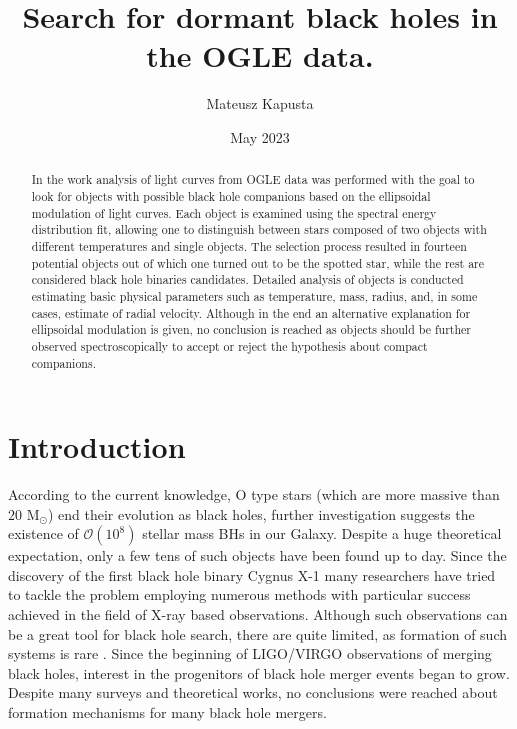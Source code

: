 \documentclass{pracalicmgr}
\author{Mateusz Kapusta}
\title{Search for dormant black holes in the OGLE data.}
\date{May 2023}
\begin{document}
    \maketitle
    \let\cleardoublepage\clearpage
\begin{abstract}
    In the work analysis of light curves from OGLE data was performed with the goal to look for objects with possible black hole companions 
    based on the ellipsoidal modulation of light curves. Each object is examined using the spectral energy distribution fit, allowing one to distinguish
    between stars composed of two objects with different temperatures and single objects. The selection process resulted in fourteen
    potential objects out of which one turned out to be the spotted star, while the rest are considered black hole binaries candidates.
    Detailed analysis of objects is conducted estimating basic physical parameters such as temperature, mass, radius,
    and, in some cases, estimate of radial velocity. Although in the end an alternative explanation for ellipsoidal modulation is given, 
    no conclusion is reached as objects should be further observed spectroscopically to accept or reject the hypothesis about compact companions.
\end{abstract}

\tableofcontents

\chapter{Introduction}
According to the current knowledge, O type stars (which are more massive than $20$ M$_\odot$) end their evolution as black holes, further investigation suggests
the existence of $\mathcal{O}(10^8)$ stellar mass BHs \citep{brown_scenario_1994} in our Galaxy.
Despite a huge theoretical expectation, only a few tens of such objects have been found up to day.
Since the discovery of the first black hole binary Cygnus X-1 many researchers have tried to tackle the problem employing numerous methods with particular
success achieved in the field of X-ray based observations. Although such observations can be a great tool for black hole search, there are quite limited,
as formation of such systems is rare \citep{zwart_formation_1997}. Since the beginning of LIGO/VIRGO observations of merging black holes,
interest in the progenitors of black hole merger events began to grow. Despite many surveys and theoretical works, 
no conclusions were reached about formation mechanisms for many black hole mergers. 
\end{document}
